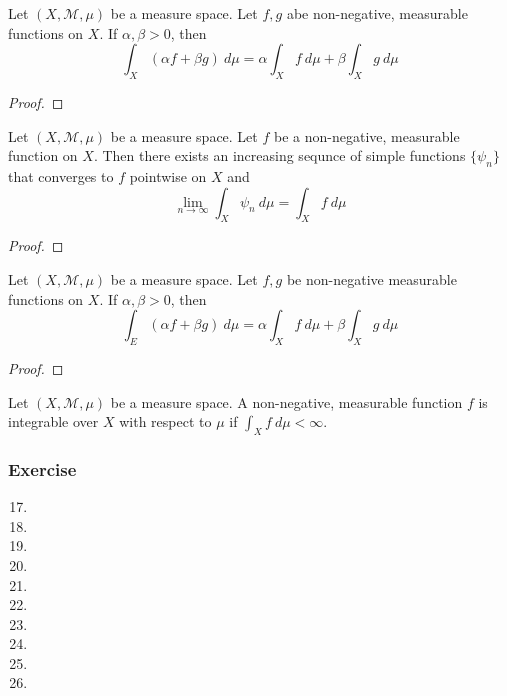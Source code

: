 \begin{theorem}
	Let $(X,\mathcal{M},\mu)$ be a measure space.
	Let $f,g$ abe non-negative, measurable functions on $X$.
	If $\alpha,\beta > 0$, then
	\[ \int_X (\alpha f + \beta g) \ d\mu = \alpha \int_X f \ d\mu + \beta\int_X g \ d\mu \]
\end{theorem}
\begin{proof}
\end{proof}

\begin{theorem}
	Let $(X,\mathcal{M},\mu)$ be a measure space.
	Let $f$ be a non-negative, measurable function on $X$.
	Then there exists an increasing sequnce of simple functions $\{ \psi_n \}$ that converges to $f$ pointwise on $X$ and
	\[ \lim_{n \to \infty} \int_X \psi_n \ d\mu = \int_X f \ d\mu \]
\end{theorem}
\begin{proof}
\end{proof}

\begin{theorem}
	Let $(X,\mathcal{M},\mu)$ be  a measure space.
	Let $f,g$ be non-negative measurable functions on $X$.
	If $\alpha,\beta > 0$, then
	\[ \int_E (\alpha f + \beta g) \ d\mu = \alpha \int_X f \ d\mu + \beta \int_X g \ d\mu \]
\end{theorem}
\begin{proof}
\end{proof}

\begin{definition}[integrable]
	Let $(X,\mathcal{M},\mu)$ be a measure space.
	A non-negative, measurable function $f$ is integrable over $X$ with respect to $\mu$ if $\displaystyle \int_X f \ d\mu < \infty$.
\end{definition}

\subsubsection{Exercise}
\begin{enumerate}
	\setcounter{enumi}{16}
	\item
	\item
	\item
	\item
	\item
	\item
	\item
	\item
	\item
	\item
\end{enumerate}

